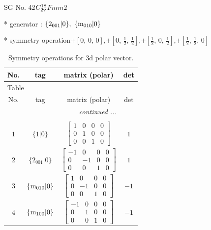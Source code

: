 \documentclass[fleqn,8pt]{jsarticle}
\begin{document}
\setcounter{MaxMatrixCols}{32}

\renewcommand{\tablename}{Table~}
\renewcommand{\figurename}{Figure~}
\begin{center}
\LARGE
SG No. 42\quad$C_{\rm 2v}^{18}$\quad$Fmm2$\quad[ orthorhombic ]
\end{center}

* generator : $\{2{}_{001}|0\},\,\,\{{\rm m}_{010}|0\}$

* symmetry operation\quad$+\left[ 0,\, 0,\, 0 \right]$,\quad $+\left[ 0,\, \frac{1}{2},\, \frac{1}{2} \right]$,\quad $+\left[ \frac{1}{2},\, 0,\, \frac{1}{2} \right]$,\quad $+\left[ \frac{1}{2},\, \frac{1}{2},\, 0 \right]$
\renewcommand{\arraystretch}{1.3}
\begin{longtable}{cccc}
\caption{Symmetry operations for 3d polar vector.}
 \\
 \hline \hline
No. & tag & matrix (polar) & det \\ \hline \endfirsthead

\multicolumn{3}{l}{\tablename\ \thetable{}} \\
 \hline \hline
No. & tag & matrix (polar) & det \\ \hline \endhead

 \hline \hline
\multicolumn{3}{r}{\footnotesize\it continued ...} \\ \endfoot

 \hline \hline
\multicolumn{3}{r}{} \\ \endlastfoot

$ 1 $ & $ \{1|0\} $ & $ \begin{bmatrix} 1 & 0 & 0 & 0 \\ 0 & 1 & 0 & 0 \\ 0 & 0 & 1 & 0 \end{bmatrix} $ & $ 1 $ \\ \hline
$ 2 $ & $ \{2{}_{001}|0\} $ & $ \begin{bmatrix} -1 & 0 & 0 & 0 \\ 0 & -1 & 0 & 0 \\ 0 & 0 & 1 & 0 \end{bmatrix} $ & $ 1 $ \\ \hline
$ 3 $ & $ \{{\rm m}_{010}|0\} $ & $ \begin{bmatrix} 1 & 0 & 0 & 0 \\ 0 & -1 & 0 & 0 \\ 0 & 0 & 1 & 0 \end{bmatrix} $ & $ -1 $ \\ \hline
$ 4 $ & $ \{{\rm m}_{100}|0\} $ & $ \begin{bmatrix} -1 & 0 & 0 & 0 \\ 0 & 1 & 0 & 0 \\ 0 & 0 & 1 & 0 \end{bmatrix} $ & $ -1 $ \\
\end{longtable}
\end{document}
